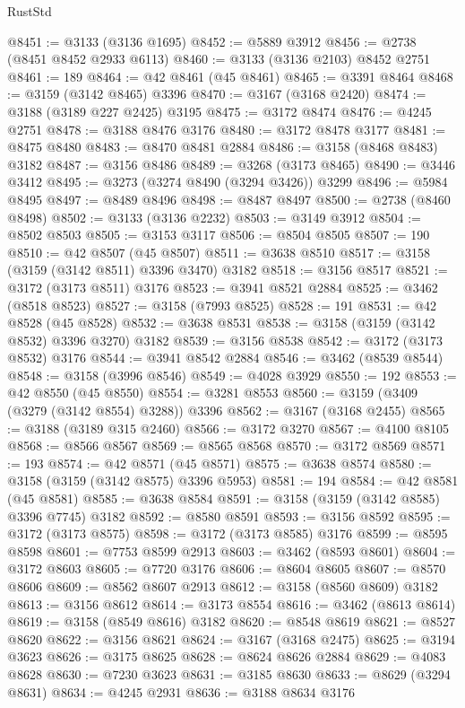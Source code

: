 \begin{lexlean}{RustStd}
\begin{coremodule}
@8451 := @3133 (@3136 @1695)
@8452 := @5889 @3912
@8456 := @2738 (@8451 @8452 @2933 @6113)
@8460 := @3133 (@3136 @2103) @8452 @2751
@8461 := 189
@8464 := @42 @8461 (@45 @8461)
@8465 := @3391 @8464
@8468 := @3159 (@3142 @8465) @3396
@8470 := @3167 (@3168 @2420)
@8474 := @3188 (@3189 @227 @2425) @3195
@8475 := @3172 @8474
@8476 := @4245 @2751
@8478 := @3188 @8476 @3176
@8480 := @3172 @8478 @3177
@8481 := @8475 @8480
@8483 := @8470 @8481 @2884
@8486 := @3158 (@8468 @8483) @3182
@8487 := @3156 @8486
@8489 := @3268 (@3173 @8465)
@8490 := @3446 @3412
@8495 := @3273 (@3274 @8490 (@3294 @3426)) @3299
@8496 := @5984 @8495
@8497 := @8489 @8496
@8498 := @8487 @8497
@8500 := @2738 (@8460 @8498)
@8502 := @3133 (@3136 @2232)
@8503 := @3149 @3912
@8504 := @8502 @8503
@8505 := @3153 @3117
@8506 := @8504 @8505
@8507 := 190
@8510 := @42 @8507 (@45 @8507)
@8511 := @3638 @8510
@8517 := @3158 (@3159 (@3142 @8511) @3396 @3470) @3182
@8518 := @3156 @8517
@8521 := @3172 (@3173 @8511) @3176
@8523 := @3941 @8521 @2884
@8525 := @3462 (@8518 @8523)
@8527 := @3158 (@7993 @8525)
@8528 := 191
@8531 := @42 @8528 (@45 @8528)
@8532 := @3638 @8531
@8538 := @3158 (@3159 (@3142 @8532) @3396 @3270) @3182
@8539 := @3156 @8538
@8542 := @3172 (@3173 @8532) @3176
@8544 := @3941 @8542 @2884
@8546 := @3462 (@8539 @8544)
@8548 := @3158 (@3996 @8546)
@8549 := @4028 @3929
@8550 := 192
@8553 := @42 @8550 (@45 @8550)
@8554 := @3281 @8553
@8560 := @3159 (@3409 (@3279 (@3142 @8554) @3288)) @3396
@8562 := @3167 (@3168 @2455)
@8565 := @3188 (@3189 @315 @2460)
@8566 := @3172 @3270
@8567 := @4100 @8105
@8568 := @8566 @8567
@8569 := @8565 @8568
@8570 := @3172 @8569
@8571 := 193
@8574 := @42 @8571 (@45 @8571)
@8575 := @3638 @8574
@8580 := @3158 (@3159 (@3142 @8575) @3396 @5953)
@8581 := 194
@8584 := @42 @8581 (@45 @8581)
@8585 := @3638 @8584
@8591 := @3158 (@3159 (@3142 @8585) @3396 @7745) @3182
@8592 := @8580 @8591
@8593 := @3156 @8592
@8595 := @3172 (@3173 @8575)
@8598 := @3172 (@3173 @8585) @3176
@8599 := @8595 @8598
@8601 := @7753 @8599 @2913
@8603 := @3462 (@8593 @8601)
@8604 := @3172 @8603
@8605 := @7720 @3176
@8606 := @8604 @8605
@8607 := @8570 @8606
@8609 := @8562 @8607 @2913
@8612 := @3158 (@8560 @8609) @3182
@8613 := @3156 @8612
@8614 := @3173 @8554
@8616 := @3462 (@8613 @8614)
@8619 := @3158 (@8549 @8616) @3182
@8620 := @8548 @8619
@8621 := @8527 @8620
@8622 := @3156 @8621
@8624 := @3167 (@3168 @2475)
@8625 := @3194 @3623
@8626 := @3175 @8625
@8628 := @8624 @8626 @2884
@8629 := @4083 @8628
@8630 := @7230 @3623
@8631 := @3185 @8630
@8633 := @8629 (@3294 @8631)
@8634 := @4245 @2931
@8636 := @3188 @8634 @3176

\end{coremodule}
\end{lexlean}

